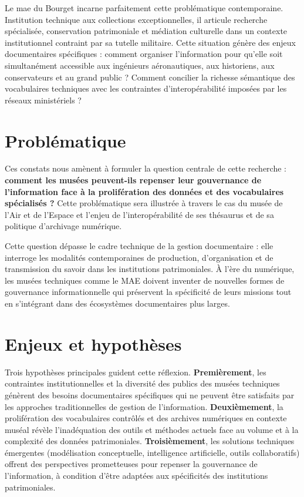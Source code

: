Le \acf{mae} du Bourget incarne parfaitement cette problématique contemporaine. Institution technique aux collections exceptionnelles, il articule recherche spécialisée, conservation patrimoniale et médiation culturelle dans un contexte institutionnel contraint par sa tutelle militaire. Cette situation génère des enjeux documentaires spécifiques : comment organiser l'information pour qu'elle soit simultanément accessible aux ingénieurs aéronautiques, aux historiens, aux conservateurs et au grand public ? Comment concilier la richesse sémantique des vocabulaires techniques avec les contraintes d'interopérabilité imposées par les réseaux ministériels ?

\section*{Problématique}

Ces constats nous amènent à formuler la question centrale de cette recherche : \textbf{comment les musées peuvent-ils repenser leur gouvernance de l'information face à la prolifération des données et des vocabulaires spécialisés ?} Cette problématique sera illustrée à travers le cas du musée de l'Air et de l'Espace et l'enjeu de l'interopérabilité de ses thésaurus et de sa politique d'archivage numérique.

Cette question dépasse le cadre technique de la gestion documentaire : elle interroge les modalités contemporaines de production, d'organisation et de transmission du savoir dans les institutions patrimoniales. À l'ère du numérique, les musées techniques comme le MAE doivent inventer de nouvelles formes de gouvernance informationnelle qui préservent la spécificité de leurs missions tout en s'intégrant dans des écosystèmes documentaires plus larges.

\section*{Enjeux et hypothèses}

Trois hypothèses principales guident cette réflexion. \textbf{Premièrement}, les contraintes institutionnelles et la diversité des publics des musées techniques génèrent des besoins documentaires spécifiques qui ne peuvent être satisfaits par les approches traditionnelles de gestion de l'information. \textbf{Deuxièmement}, la prolifération des vocabulaires contrôlés et des archives numériques en contexte muséal révèle l'inadéquation des outils et méthodes actuels face au volume et à la complexité des données patrimoniales. \textbf{Troisièmement}, les solutions techniques émergentes (modélisation conceptuelle, intelligence artificielle, outils collaboratifs) offrent des perspectives prometteuses pour repenser la gouvernance de l'information, à condition d'être adaptées aux spécificités des institutions patrimoniales.

